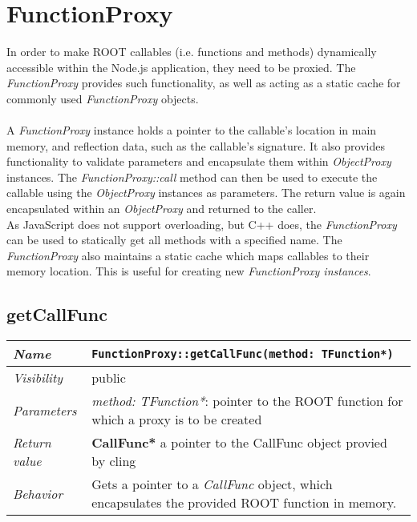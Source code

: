 \chapter{FunctionProxy}
In order to make ROOT callables (i.e. functions and methods) dynamically accessible within the Node.js application, they need to be proxied. The \textit{FunctionProxy} provides such functionality, as well as acting as a static cache for commonly used \textit{FunctionProxy} objects.\\
\\
A \textit{FunctionProxy} instance holds a pointer to the callable's location in main memory, and reflection data, such as the callable's signature. It also provides functionality to validate parameters and encapsulate them within \textit{ObjectProxy} instances. The \textit{FunctionProxy::call} method can then be used to execute the callable using the \textit{ObjectProxy} instances as parameters. The return value is again encapsulated within an \textit{ObjectProxy} and returned to the caller.\\
As JavaScript does not support overloading, but C++ does, the \textit{FunctionProxy} can be used to statically get all methods with a specified name. The \textit{FunctionProxy} also maintains a static cache which maps callables to their memory location. This is useful for creating new \textit{FunctionProxy instances}.\\

\section{getCallFunc}
\begin{longtable}{p{3cm} @{\hskip 1cm} p{12cm}}
	\hline

	\textit{Name} & \texttt{FunctionProxy::getCallFunc(method: TFunction*)}\\
	\hline

	\textit{Visibility} & public\\
	\hline

	\textit{Parameters} &  \textit{method: TFunction*}: pointer to the ROOT function for which a proxy 
							is to be created\\
	\hline

	\textit{Return value} & \textbf{CallFunc*} a pointer to the CallFunc object provied by cling\\
	\hline

	\textit{Behavior} & Gets a pointer to a \textit{CallFunc} object, which encapsulates the provided ROOT function in memory.\\
	\hline

\end{longtable} 

